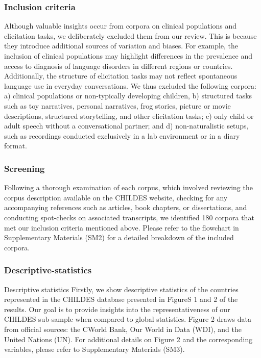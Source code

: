 \documentclass[
  man,floatsintext]{apa6}
\begin{document}
\hypertarget{inclusion-criteria}{%
\subsubsection{Inclusion criteria}\label{inclusion-criteria}}

Although valuable insights occur from corpora on clinical populations and elicitation tasks, we deliberately excluded them from our review. This is because they introduce additional sources of variation and biases. For example, the inclusion of clinical populations may highlight differences in the prevalence and access to diagnosis of language disorders in different regions or countries. Additionally, the structure of elicitation tasks may not reflect spontaneous language use in everyday conversations. We thus excluded the following corpora: a) clinical populations or non-typically developing children, b) structured tasks such as toy narratives, personal narratives, frog stories, picture or movie descriptions, structured storytelling, and other elicitation tasks; c) only child or adult speech without a conversational partner; and d) non-naturalistic setups, such as recordings conducted exclusively in a lab environment or in a diary format.

\hypertarget{screening}{%
\subsubsection{Screening}\label{screening}}

Following a thorough examination of each corpus, which involved reviewing the corpus description available on the CHILDES website, checking for any accompanying references such as articles, book chapters, or dissertations, and conducting spot-checks on associated transcripts, we identified 180 corpora that met our inclusion criteria mentioned above. Please refer to the flowchart in Supplementary Materials (SM2) for a detailed breakdown of the included corpora.

\hypertarget{descriptive-statistics}{%
\subsubsection{Descriptive-statistics}\label{descriptive-statistics}}

Descriptive statistics
Firstly, we show descriptive statistics of the countries represented in the CHILDES database presented in FigureS 1 and 2 of the results. Our goal is to provide insights into the representativeness of our CHILDES sub-sample when compared to global statistics. Figure 2 draws data from official sources: the CWorld Bank, Our World in Data (WDI), and the United Nations (UN). For additional details on Figure 2 and the corresponding variables, please refer to Supplementary Materials (SM3).
\end{document}
